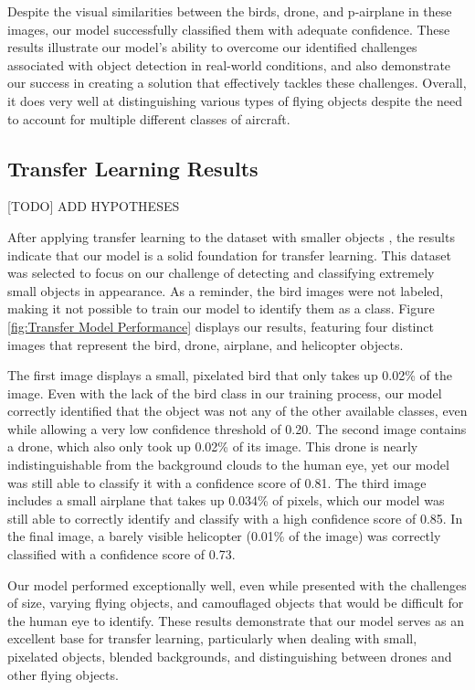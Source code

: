 \documentclass[10pt,twocolumn,letterpaper]{article}
\begin{document}
Despite the visual similarities between the birds, drone, and p-airplane in these images, our model successfully classified them with adequate confidence. These results illustrate our model's ability to overcome our identified challenges associated with object detection in real-world conditions, and also demonstrate our success in creating a solution that effectively tackles these challenges. Overall, it does very well at distinguishing various types of flying objects despite the need to account for multiple different classes of aircraft.

\subsection{Transfer Learning Results}

[TODO] ADD HYPOTHESES

After applying transfer learning to the dataset with smaller objects \cite{TransferDataset}, the results indicate that our model is a solid foundation for transfer learning. This dataset was selected to focus on our challenge of detecting and classifying extremely small objects in appearance. As a reminder, the bird images were not labeled, making it not possible to train our model to identify them as a class. Figure \ref{fig:Transfer Model Performance} displays our results, featuring four distinct images that represent the bird, drone, airplane, and helicopter objects.

The first image displays a small, pixelated bird that only takes up 0.02\% of the image. Even with the lack of the bird class in our training process, our model correctly identified that the object was not any of the other available classes, even while allowing a very low confidence threshold of 0.20. The second image contains a drone, which also only took up 0.02\% of its image. This drone is nearly indistinguishable from the background clouds to the human eye, yet our model was still able to classify it with a confidence score of 0.81. The third image includes a small airplane that takes up 0.034\% of pixels, which our model was still able to correctly identify and classify with a high confidence score of 0.85. In the final image, a barely visible helicopter (0.01\% of the image) was correctly classified with a confidence score of 0.73.

Our model performed exceptionally well, even while presented with the challenges of size, varying flying objects, and camouflaged objects that would be difficult for the human eye to identify. These results demonstrate that our model serves as an excellent base for transfer learning, particularly when dealing with small, pixelated objects, blended backgrounds, and distinguishing between drones and other flying objects.
\end{document}
